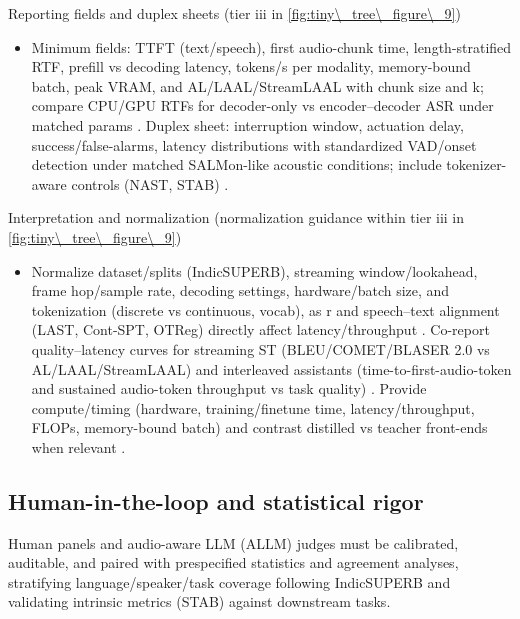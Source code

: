 \documentclass{article}
\begin{document}
Reporting fields and duplex sheets (tier iii in \autoref{fig:tiny\_tree\_figure\_9})
\begin{itemize}
  \item Minimum fields: TTFT (text/speech), first audio-chunk time, length-stratified RTF, prefill vs decoding latency, tokens/s per modality, memory-bound batch, peak VRAM, and AL/LAAL/StreamLAAL with chunk size and k; compare CPU/GPU RTFs for decoder-only vs encoder--decoder ASR under matched params \cite{tsunoo2024decoderonlyarchitecturespeechrecognition}. Duplex sheet: interruption window, actuation delay, success/false-alarms, latency distributions with standardized VAD/onset detection under matched SALMon-like acoustic conditions; include tokenizer-aware controls (NAST, STAB) \cite{messica2024nastnoiseawarespeechtokenizationlanguage,maimon2025salmonsuiteacousticlanguagemodelevaluati,vashishth2024stabspeechtokenizerassessmentbenchmark}.
\end{itemize}

Interpretation and normalization (normalization guidance within tier iii in \autoref{fig:tiny\_tree\_figure\_9})
\begin{itemize}
  \item Normalize dataset/splits (IndicSUPERB), streaming window/lookahead, frame hop/sample rate, decoding settings, hardware/batch size, and tokenization (discrete vs continuous, vocab), as r and speech--text alignment (LAST, Cont-SPT, OTReg) directly affect latency/throughput \cite{turetzky2024lastlanguagemodelawarespeechtokenization,li2025continuousspeechtokenizertext,xu2025optimaltransportregularizationspeechtext}. Co-report quality--latency curves for streaming ST (BLEU/COMET/BLASER 2.0 vs AL/LAAL/StreamLAAL) and interleaved assistants (time-to-first-audio-token and sustained audio-token throughput vs task quality) \cite{maimon2025scalinganalysisinterleavedspeechtextlang,guo2025streamuniachievingstreamingspeechtransla,chen2024bestowefficientstreamablespeechlanguagem,zhao2024textlessstreamingspeechtranslationsemant}. Provide compute/timing (hardware, training/finetune time, latency/throughput, FLOPs, memory-bound batch) and contrast distilled vs teacher front-ends when relevant \cite{maimon2025slammingtrainingspeechlanguagemodelonegp}.
\end{itemize}

\subsection{Human-in-the-loop and statistical rigor} \label{subsec:Human-in-the-loop and statistical rigor}
Human panels and audio-aware LLM (ALLM) judges must be calibrated, auditable, and paired with prespecified statistics and agreement analyses, stratifying language/speaker/task coverage following IndicSUPERB and validating intrinsic metrics (STAB) against downstream tasks.
\end{document}

